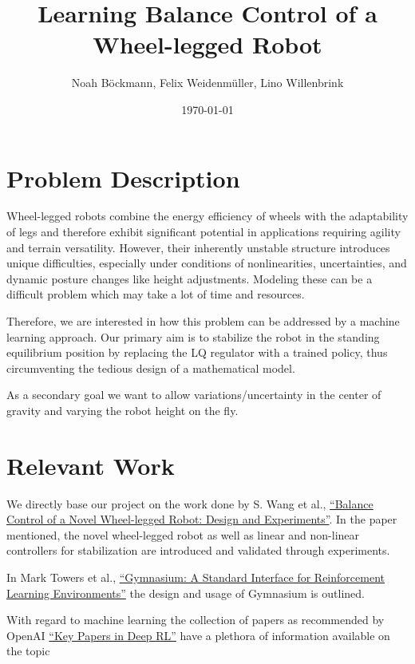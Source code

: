 \documentclass[a4paper]{article}
\title{Learning Balance Control of a Wheel-legged Robot}
\author{Noah Böckmann, Felix Weidenmüller, Lino Willenbrink}
\date{\today}
\begin{document}
\maketitle
\section{Problem Description}
Wheel-legged robots combine the energy efficiency of wheels with the adaptability of legs and
therefore exhibit significant potential in applications requiring agility and terrain versatility.
However, their inherently unstable structure introduces unique difficulties, especially under
conditions of nonlinearities, uncertainties, and dynamic posture changes like height adjustments.
Modeling these can be a difficult problem which may take a lot of time and resources.

Therefore, we are interested in how this problem can be addressed by a machine learning approach.
Our primary aim is to stabilize the robot in the standing equilibrium position by replacing the LQ
regulator with a trained policy, thus circumventing the tedious design of a mathematical model.

As a secondary goal we want to allow variations/uncertainty in the center of gravity and varying the
robot height on the fly.

\section{Relevant Work}
We directly base our project on the work done by S. Wang et al.,
\hyperref{https://ieeexplore.ieee.org/document/9561579}{}{}{``Balance Control of a Novel
Wheel-legged Robot: Design and Experiments''}. In the paper mentioned,
the novel wheel-legged robot as well as linear and non-linear controllers for stabilization are
introduced and validated through experiments.

In Mark Towers et al.,
\hyperref{https://arxiv.org/abs/2407.17032}{}{}{``Gymnasium: A Standard Interface for Reinforcement
Learning Environments''} the design and usage of Gymnasium is outlined.

With regard to machine learning the collection of papers as recommended by OpenAI 
\hyperref{https://spinningup.openai.com/en/latest/spinningup/keypapers.html}{}{}{``Key Papers in Deep RL''}
have a plethora of information available on the topic
\end{document}
